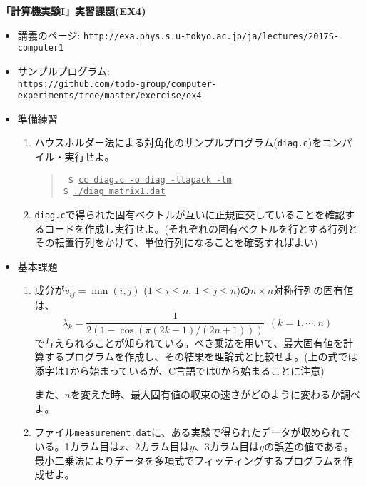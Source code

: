 \documentclass[11pt]{jarticle}
\begin{document}
\noindent
{\bf\large 「計算機実験I」実習課題(EX4)}
\\[-0.5em]

\noindent
\begin{itemize}
\item 講義のページ: \verb+http://exa.phys.s.u-tokyo.ac.jp/ja/lectures/2017S-computer1+

\item サンプルプログラム: \\ {\small \verb+https://github.com/todo-group/computer-experiments/tree/master/exercise/ex4+}
  
\item 準備練習
  \begin{enumerate}
  \item ハウスホルダー法による対角化のサンプルプログラム({\tt diag.c})をコンパイル・実行せよ。
    \begin{quote} \tt
      \$ \underline{cc diag.c -o diag -llapack -lm} \\
      \$ \underline{./diag matrix1.dat}
    \end{quote}
  \item {\tt diag.c}で得られた固有ベクトルが互いに正規直交していることを確認するコードを作成し実行せよ。(それぞれの固有ベクトルを行とする行列とその転置行列をかけて、単位行列になることを確認すればよい)
  \end{enumerate}

\item 基本課題
  \begin{enumerate}
  \item 成分が$v_{ij}=\min(i,j)$ ($1 \le i \le n$, $1 \le j \le n$)の$n \times n$対称行列の固有値は、
    \[ \lambda_k = \frac{1}{2 (1 - \cos (\pi (2 k - 1) / (2 n + 1)))} \ \ (k=1,\cdots,n)\]
    で与えられることが知られている。べき乗法を用いて、最大固有値を計算するプログラムを作成し、その結果を理論式と比較せよ。(上の式では添字は1から始まっているが、C言語では0から始まることに注意)

    また、$n$を変えた時、最大固有値の収束の速さがどのように変わるか調べよ。
  \item ファイル{\tt measurement.dat}に、ある実験で得られたデータが収められている。1カラム目は$x$、2カラム目は$y$、3カラム目は$y$の誤差の値である。最小二乗法によりデータを多項式でフィッティングするプログラムを作成せよ。


\end{enumerate}
\end{itemize}
\end{document}
